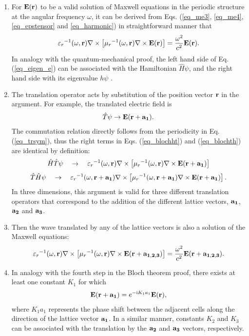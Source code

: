 \begin{enumerate}
\item{
For $\mathbf{E}({\mathbf{r}})$ to be a  valid solution of Maxwell equations in the periodic structure at the angular frequency $\omega$,
it can be derived from Eqs. (\ref{eq_me3}, \ref{eq_me4}, \ref{eq_epstensor} and \ref{eq_harmonic}) in straightforward manner that
\begin{equation} 
{\varepsilon_r}^{-1}(\omega,{\mathbf{r}}) \nabla\times \left[{\mu_r}^{-1 }(\omega,{\mathbf{r}}) \nabla\times \mathbf{E}({\mathbf{r}}) \right] = \frac{\omega^2}{c^2}\mathbf{E}({\mathbf{r}}).   \label{eq_eigen_e}
\end{equation}
In analogy with the quantum-mechanical proof, the left hand side of Eq. (\ref{eq_eigen_e}) can be associated with the Hamiltonian $\hat H\psi$, and the right hand side with its eigenvalue $h\psi$ \cite{johnson2003introduction}. 
} 
\item{
The translation operator acts by substitution of the position vector ${\mathbf{r}}$ in the argument. For example, the translated electric field is
\begin{equation} \hat T\psi \rightarrow \mathbf{E}({\mathbf{r}}+\mathbf{a_1}). \label{eq_blocht}\end{equation}
The commutation relation directly follows from the periodicity in Eq. (\ref{eq_trsym}), thus the right terms in Eqs. (\ref{eq_blochht}) and (\ref{eq_blochth}) are identical by definition:
\begin{equation} \hat H \hat T \psi \quad  \rightarrow \quad  {\varepsilon_r}^{-1}(\omega,{\mathbf{r}}    ) \nabla\times \left[{\mu_r}^{-1 }(\omega,{\mathbf{r}}    ) \nabla\times \mathbf{E}({\mathbf{r}}+{\mathbf{a_1}})\right]  \label{eq_blochht}\end{equation}
\begin{equation} \hat T \hat H \psi \quad  \rightarrow \quad  {\varepsilon_r}^{-1}(\omega,{\mathbf{r}}+{\mathbf{a_1}}) \nabla\times \left[{\mu_r}^{-1 }(\omega,{\mathbf{r}}+{\mathbf{a_1}}) \nabla\times \mathbf{E}({\mathbf{r}}+{\mathbf{a_1}})\right] .  \label{eq_blochth}\end{equation}
In three dimensions, this argument is valid for three different translation operators that correspond to the addition of the different lattice vectors, ${\mathbf{a_1}}$, ${\mathbf{a_2}}$ and ${\mathbf{a_3}}$.
} 
\item{
Then the wave translated by any of the lattice vectors is also a solution of the Maxwell equations:
\begin{equation}  {\varepsilon_r}^{-1}(\omega,{\mathbf{r}}) \nabla\times \left[{\mu_r}^{-1 }(\omega,{\mathbf{r}}) \nabla\times   \mathbf{E}({\mathbf{r}}+{\mathbf{a_{1,2,3}}})\right] =  \frac{\omega^2}{c^2}\mathbf{E}({\mathbf{r}}+{\mathbf{a_{1,2,3}}}).  \label{eq_blochme}\end{equation}
}
\item{In analogy with the fourth step in the Bloch theorem proof, there exists at least one constant $K_1$ for which
\begin{equation}  \mathbf{E}({\mathbf{r}}+{\mathbf{a_1}}) = e^{-{\mathrm i} K_1 a_1} \mathbf{E}({\mathbf{r}}),  \label{eq_blochtt}\end{equation}
	where $K_1 a_1$ represents the phase shift between the adjacent cells along the direction of the lattice vector ${\mathbf{a_1}}$. In a similar manner, constants $K_2$ and $K_3$ can be associated with the translation by the ${\mathbf{a_2}}$ and ${\mathbf{a_3}}$ vectors, respectively. 
}
 \end{enumerate}

